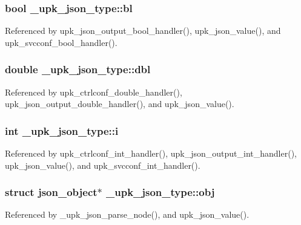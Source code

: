 \subsubsection[{bl}]{\setlength{\rightskip}{0pt plus 5cm}bool {\bf \_\-upk\_\-json\_\-type::bl}}\label{struct__upk__json__type_aad607b1d4759fe0fa7525789592e18f2}


Referenced by upk\_\-json\_\-output\_\-bool\_\-handler(), upk\_\-json\_\-value(), and upk\_\-svcconf\_\-bool\_\-handler().

\subsubsection[{dbl}]{\setlength{\rightskip}{0pt plus 5cm}double {\bf \_\-upk\_\-json\_\-type::dbl}}\label{struct__upk__json__type_ac4e041911e770d955fd0318fe8e9ef1e}


Referenced by upk\_\-ctrlconf\_\-double\_\-handler(), upk\_\-json\_\-output\_\-double\_\-handler(), and upk\_\-json\_\-value().

\subsubsection[{i}]{\setlength{\rightskip}{0pt plus 5cm}int {\bf \_\-upk\_\-json\_\-type::i}}\label{struct__upk__json__type_a461839ba2cd1bf2127121bda9c362a06}


Referenced by upk\_\-ctrlconf\_\-int\_\-handler(), upk\_\-json\_\-output\_\-int\_\-handler(), upk\_\-json\_\-value(), and upk\_\-svcconf\_\-int\_\-handler().

\subsubsection[{obj}]{\setlength{\rightskip}{0pt plus 5cm}struct json\_\-object$\ast$ {\bf \_\-upk\_\-json\_\-type::obj}}\label{struct__upk__json__type_a465bb44c188f1e4b85840cd9ba933a91}


Referenced by \_\-upk\_\-json\_\-parse\_\-node(), and upk\_\-json\_\-value().

